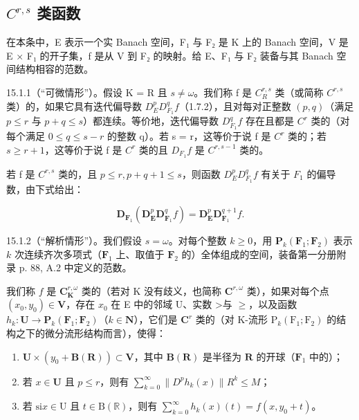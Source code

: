 \subsection{\texorpdfstring{\(C^{r,s}\) 类函数}{C\^{}\{r,s\} 类函数}}

在本条中，E 表示一个实 Banach 空间，F₁ 与 F₂ 是 K 上的 Banach 空间，V 是 E × F₁ 的开子集，f 是从 V 到 F₂ 的映射。给 E、F₁ 与 F₂ 装备与其 Banach 空间结构相容的范数。

15.1.1（“可微情形”）。假设 K = R 且 \(s \neq \omega\)。我们称 f 是 \(C_{R}^{r,s}\) 类（或简称 \(C^{r,s}\) 类）的，如果它具有迭代偏导数 \(D_{E}^{p}D_{F_{1}}^{q}f\)（1.7.2），且对每对正整数 \((p,q)\)（满足 \(p \leqslant r\) 与 \(p + q \leqslant s\)）都连续。等价地，迭代偏导数 \(D_{F_{1}}^{q}f\) 存在且都是 \(C^{r}\) 类的（对每个满足 \(0 \leqslant q \leqslant s - r\) 的整数 q）。若 s = r，这等价于说 f 是 \(C^{r}\) 类的；若 \(s \geqslant r + 1\)，这等价于说 f 是 \(C^{r}\) 类的且 \(D_{F_{1}}f\) 是 \(C^{r,s-1}\) 类的。

若 f 是 \(C^{r,s}\) 类的，且 \(p \leqslant r, p + q + 1 \leqslant s\)，则函数 \(D_{E}^{p}D_{F_{1}}^{q}f\) 有关于 \(F_{1}\) 的偏导数，由下式给出：

\[
\mathbf {D} _ {\mathbf {F} _ {1}} (\mathbf {D} _ {\mathbf {E}} ^ {p} \mathbf {D} _ {\mathbf {F} _ {1}} ^ {q} f) = \mathbf {D} _ {\mathbf {E}} ^ {p} \mathbf {D} _ {\mathbf {F} _ {1}} ^ {q + 1} f.\tag{1}
\]

15.1.2（“解析情形”）。我们假设 \(s = \omega\)。对每个整数 \(k \geqslant 0\)，用 \(\mathbf{P}_{k}(\mathbf{F}_{1}; \mathbf{F}_{2})\) 表示 \(k\) 次连续齐次多项式（\(\mathbf{F}_{1}\) 上、取值于 \(\mathbf{F}_{2}\) 的）全体组成的空间，装备第一分册附录 p. 88, A.2 中定义的范数。

我们称 \(f\) 是 \(\mathbf{C}_{\mathbf{K}}^{r,\omega}\) 类的（若对 K 没有歧义，也简称 \(\mathbf{C}^{r,\omega}\) 类），如果对每个点 \((x_{0},y_{0})\in\mathbf{V}\)，存在 \(x_{0}\) 在 E 中的邻域 U、实数 \textgreater 与 \(\geqslant\)，以及函数 \(h_{k}\colon\mathbf{U}\to\mathbf{P}_{k}(\mathbf{F}_{1};\mathbf{F}_{2})\)（\(k\in\mathbf{N}\)），它们是 \(\mathbf{C}^{r}\) 类的（对 K-流形 \(\mathrm{P}_{k}(\mathrm{F}_{1};\mathrm{F}_{2})\) 的结构之下的微分流形结构而言），使得：

\begin{enumerate}
\def\labelenumi{(\roman{enumi})}
\item
  \(\mathbf{U} \times (y_0 + \mathbf{B}(\mathbf{R})) \subset \mathbf{V}\)，其中 \(\mathbf{B}(\mathbf{R})\) 是半径为 \(\mathbf{R}\) 的开球（\(\mathbf{F}_1\) 中的）；
\item
  若 \(x \in \mathbf{U}\) 且 \(p \leqslant r\)，则有 \(\sum_{k=0}^{\infty} \| D^p h_k(x) \| R^k \leqslant M\)；
\item
  若 \(\mathrm{si} x \in \mathrm{U}\) 且 \(t \in \mathrm{B}(\mathbb{R})\)，则有 \(\sum_{k=0}^{\infty} h_k(x)(t) = f(x, y_0 + t)\)。
\end{enumerate}

